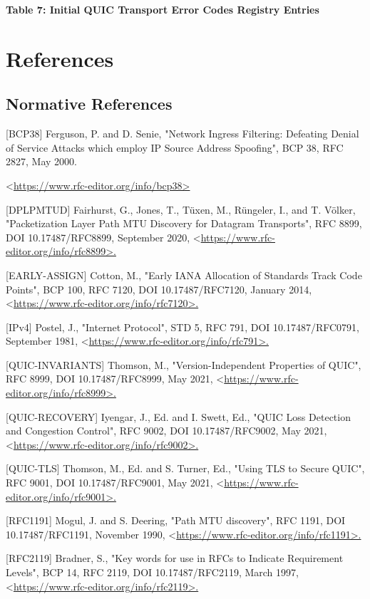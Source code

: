 \documentclass{article}
\begin{document}
\begin{center}
\textbf{Table 7: Initial QUIC Transport Error Codes Registry Entries}
\end{center}

\section{References}

\subsection{Normative References}

[BCP38]    Ferguson, P. and D. Senie, "Network Ingress Filtering: Defeating Denial of Service Attacks which employ IP Source Address Spoofing", BCP 38, RFC 2827, May 2000.

<\url{https://www.rfc-editor.org/info/bcp38>}

[DPLPMTUD] Fairhurst, G., Jones, T., Tüxen, M., Rüngeler, I., and T. Völker, "Packetization Layer Path MTU Discovery for Datagram Transports", RFC 8899, DOI 10.17487/RFC8899, September 2020, <\url{https://www.rfc-editor.org/info/rfc8899>.}

[EARLY-ASSIGN] Cotton, M., "Early IANA Allocation of Standards Track Code Points", BCP 100, RFC 7120, DOI 10.17487/RFC7120, January 2014, <\url{https://www.rfc-editor.org/info/rfc7120>.}

[IPv4]     Postel, J., "Internet Protocol", STD 5, RFC 791, DOI 10.17487/RFC0791, September 1981, <\url{https://www.rfc-editor.org/info/rfc791>.}

[QUIC-INVARIANTS] Thomson, M., "Version-Independent Properties of QUIC", RFC 8999, DOI 10.17487/RFC8999, May 2021, <\url{https://www.rfc-editor.org/info/rfc8999>.}

[QUIC-RECOVERY] Iyengar, J., Ed. and I. Swett, Ed., "QUIC Loss Detection and Congestion Control", RFC 9002, DOI 10.17487/RFC9002, May 2021, <\url{https://www.rfc-editor.org/info/rfc9002>.}

[QUIC-TLS] Thomson, M., Ed. and S. Turner, Ed., "Using TLS to Secure QUIC", RFC 9001, DOI 10.17487/RFC9001, May 2021, <\url{https://www.rfc-editor.org/info/rfc9001>.}

[RFC1191]  Mogul, J. and S. Deering, "Path MTU discovery", RFC 1191, DOI 10.17487/RFC1191, November 1990, <\url{https://www.rfc-editor.org/info/rfc1191>.}

[RFC2119]  Bradner, S., "Key words for use in RFCs to Indicate Requirement Levels", BCP 14, RFC 2119, DOI 10.17487/RFC2119, March 1997, <\url{https://www.rfc-editor.org/info/rfc2119>.}
\end{document}

